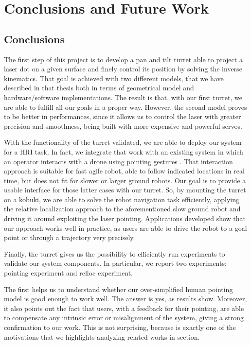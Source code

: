 \chapter{Conclusions and Future Work} 
\label{chap:5} 
\section{Conclusions}
The first step of this project is to develop a pan and tilt turret able to project a laser dot on a given surface and finely control its position by solving the inverse kinematics. That goal is achieved with two different models, that we have described in that thesis both in terms of geometrical model and hardware/software implementations. The result is that, with our first turret, we are able to fulfill all our goals in a proper way. However, the second model proves to be better in performances, since it allows us to control the laser with greater precision and smoothness, being built with more expensive and powerful servos.

With the functionality of the turret validated, we are able to deploy our system for a \ac{HRI} task. In fact, we integrate that work with an existing system in which an operator interacts with a drone using pointing gestures \cite{gromov2018robot}. That interaction approach is suitable for fast agile robot, able to follow indicated locations in real time, but does not fit for slower or larger ground robots. Our goal is to provide a usable interface for those latter cases with our turret. So, by mounting the turret on a kobuki, we are able to solve the robot navigation task efficiently, applying the relative localization approach to the aforementioned slow ground robot and driving it around exploiting the laser pointing. Applications developed show that our approach works well in practice, as users are able to drive the robot to a goal point or through a trajectory very precisely.

Finally, the turret gives us the possibility to efficiently run experiments to validate our system components. In particular, we report two experiments: pointing experiment and \ac{relloc} experiment.

The first helps us to understand whether our over-simplified human pointing model is good enough to work well. The answer is yes, as results show. Moreover, it also points out the fact that users, with a feedback for their pointing, are able to compensate any intrinsic error or misalignment of the system, giving a strong confirmation to our work. This is not surprising, because is exactly one of the motivations that we highlights analyzing related works in \textit{} section.

